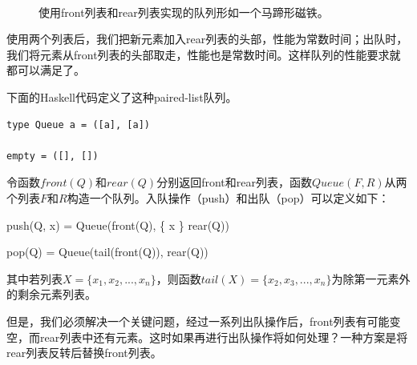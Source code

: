 \documentclass[UTF8]{article}
\begin{document}
\begin{figure}[htbp]
  \centering
   \\
  \caption{使用front列表和rear列表实现的队列形如一个马蹄形磁铁。} \label{fig:horseshoe-magnet}
\end{figure}

使用两个列表后，我们把新元素加入rear列表的头部，性能为常数时间；出队时，我们将元素从front列表的头部取走，性能也是常数时间。这样队列的性能要求就都可以满足了。

下面的Haskell代码定义了这种paired-list队列。

\lstset{language=Haskell}
\begin{lstlisting}
type Queue a = ([a], [a])

empty = ([], [])
\end{lstlisting}

令函数$front(Q)$和$rear(Q)$分别返回front和rear列表，函数$Queue(F, R)$从两个列表$F$和$R$构造一个队列。入队操作（push）和出队（pop）可以定义如下：

\be
push(Q, x) = Queue(front(Q), \{ x \} \cup rear(Q))
\ee

\be
pop(Q) = Queue(tail(front(Q)), rear(Q))
\ee

其中若列表$X =  \{ x_1, x_2, ..., x_n \}$，则函数$tail(X) = \{ x_2, x_3, ..., x_n \}$为除第一元素外的剩余元素列表。

但是，我们必须解决一个关键问题，经过一系列出队操作后，front列表有可能变空，而rear列表中还有元素。这时如果再进行出队操作将如何处理？一种方案是将rear列表反转后替换front列表。
\end{document}
